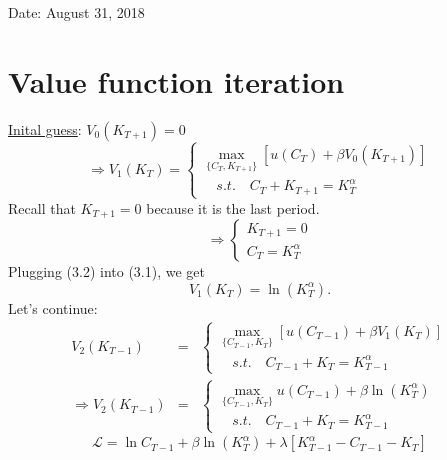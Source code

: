 \documentclass[twoside]{article}
\begin{document}

\hfill Date: August 31, 2018

\section{Value function iteration}
\underline{Inital guess}: $V_0(K_{T+1}) = 0$
\begin{equation}
\Longrightarrow
    V_1(K_T) = \begin{cases}
        \max\limits_{\{C_T, K_{T+1}\}} [u(C_T)+ \beta V_0(K_{T+1})]\\
        \quad s.t. \quad C_T + K_{T+1} = K_T^\alpha
    \end{cases}
\end{equation}
Recall that $K_{T+1} = 0$ because it is the last period.
\begin{equation}
    \Longrightarrow \begin{cases}
        K_{T+1} = 0\\
        C_T =  K_T^\alpha
    \end{cases}
\end{equation}
Plugging (3.2) into (3.1),  we get
\begin{equation}
    V_1(K_T) = \ln (K_T^\alpha).
\end{equation}
Let's continue:
\begin{eqnarray}
    V_2(K_{T-1}) &=& \begin{cases}
        \max\limits_{\{C_{T-1}, K_{T}\}} [u(C_{T-1})+ \beta V_1(K_{T})]\\
        \quad s.t. \quad C_{T-1} + K_{T} = K_{T-1}^\alpha
    \end{cases}
    \\
    \Longrightarrow
    V_2(K_{T-1}) &=& \begin{cases}
        \max\limits_{\{C_{T-1}, K_{T}\}} u(C_{T-1})+ \beta \ln (K_T^\alpha)\\
        \quad s.t. \quad C_{T-1} + K_{T} = K_{T-1}^\alpha
    \end{cases}
\end{eqnarray}
\begin{equation}
    \mathcal{L} = \ln C_{T-1} + \beta \ln (K_T^\alpha) + \lambda [K_{T-1}^\alpha - C_{T-1} - K_{T}]
\end{equation}
\end{document}
